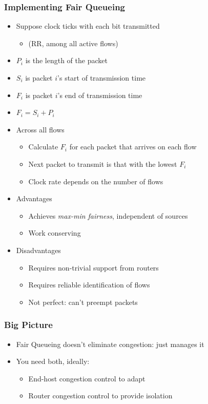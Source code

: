 \subsubsection{Implementing Fair Queueing}
\begin{itemize}[nosep]
    \item Suppose clock ticks with each bit transmitted
          \begin{itemize}[nosep]
              \item (RR, among all active flows)
          \end{itemize}
    \item $P_i$ is the length of the packet
    \item $S_i$ is packet $i$'s start of transmission time
    \item $F_i$ is packet $i$'s end of transmission time
    \item $F_i = S_i + P_i$
    \item Across all flows
          \begin{itemize}[nosep]
              \item Calculate $F_i$ for each packet that arrives on each flow
              \item Next packet to transmit is that with the lowest $F_i$
              \item Clock rate depends on the number of flows
          \end{itemize}
    \item Advantages
          \begin{itemize}[nosep]
              \item Achieves \emph{max-min fairness}, independent of sources
              \item Work conserving
          \end{itemize}
    \item Disadvantages
          \begin{itemize}[nosep]
              \item Requires non-trivial support from routers
              \item Requires reliable identification of flows
              \item Not perfect: can't preempt packets
          \end{itemize}
\end{itemize}
\subsubsection{Big Picture}
\begin{itemize}[nosep]
    \item Fair Queueing doesn't eliminate congestion: just manages it
    \item You need both, ideally:
          \begin{itemize}[nosep]
              \item End-host congestion control to adapt
              \item Router congestion control to provide isolation
          \end{itemize}
\end{itemize}
